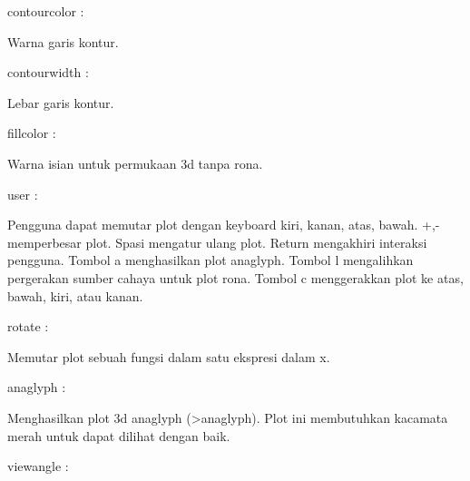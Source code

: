 \documentclass{article}
\begin{document}
\begin{eulernotebook}
\begin{eulercomment}
\begin{eulercomment}
\begin{eulercomment}
\begin{eulercomment}
\begin{eulercomment}
\begin{eulercomment}
\begin{eulercomment}
contourcolor :\\
\end{eulercomment}
\begin{eulerttcomment}
  Warna garis kontur.
\end{eulerttcomment}
\begin{eulercomment}
contourwidth :\\
\end{eulercomment}
\begin{eulerttcomment}
  Lebar garis kontur.
\end{eulerttcomment}
\begin{eulercomment}
fillcolor :\\
\end{eulercomment}
\begin{eulerttcomment}
  Warna isian untuk permukaan 3d tanpa rona.
\end{eulerttcomment}
\begin{eulercomment}
user :\\
\end{eulercomment}
\begin{eulerttcomment}
  Pengguna dapat memutar plot dengan keyboard kiri, kanan, atas,
  bawah. +,- memperbesar plot. Spasi mengatur ulang plot. Return
  mengakhiri interaksi pengguna. Tombol a menghasilkan plot anaglyph.
  Tombol l mengalihkan pergerakan sumber cahaya untuk plot rona.
  Tombol c menggerakkan plot ke atas, bawah, kiri, atau kanan.
\end{eulerttcomment}
\begin{eulercomment}
rotate :\\
\end{eulercomment}
\begin{eulerttcomment}
  Memutar plot sebuah fungsi dalam satu ekspresi dalam x.
\end{eulerttcomment}
\begin{eulercomment}
anaglyph :\\
\end{eulercomment}
\begin{eulerttcomment}
  Menghasilkan plot 3d anaglyph (>anaglyph). Plot ini membutuhkan
  kacamata merah untuk dapat dilihat dengan baik.
\end{eulerttcomment}
\begin{eulercomment}
viewangle :\\
\end{eulercomment}
\begin{eulerttcomment}

\end{eulerttcomment}
\end{eulercomment}
\end{eulercomment}
\end{eulercomment}
\end{eulercomment}
\end{eulercomment}
\end{eulercomment}
\end{eulernotebook}
\end{document}
